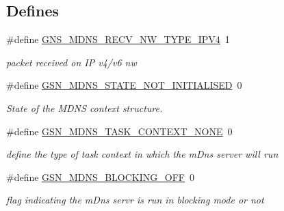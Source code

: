 \subsection*{Defines}
\begin{DoxyCompactItemize}
\item 
\#define \hyperlink{a00668_gae805e6fbb7579781605600a78cbe0959}{GNS\_\-MDNS\_\-RECV\_\-NW\_\-TYPE\_\-IPV4}~1
\begin{DoxyCompactList}\small\item\em packet received on IP v4/v6 nw \end{DoxyCompactList}\item 
\#define \hyperlink{a00668_ga0b9291043d21e03b1202e152d19abcb8}{GSN\_\-MDNS\_\-STATE\_\-NOT\_\-INITIALISED}~0
\begin{DoxyCompactList}\small\item\em State of the MDNS context structure. \end{DoxyCompactList}\item 
\#define \hyperlink{a00668_ga56106404858e7c3f99fa52890f684d53}{GSN\_\-MDNS\_\-TASK\_\-CONTEXT\_\-NONE}~0
\begin{DoxyCompactList}\small\item\em define the type of task context in which the mDns server will run \end{DoxyCompactList}\item 
\#define \hyperlink{a00668_ga67c2a611f981a7e2e787c479819f28cd}{GSN\_\-MDNS\_\-BLOCKING\_\-OFF}~0
\begin{DoxyCompactList}\small\item\em flag indicating the mDns servr is run in blocking mode or not \end{DoxyCompactList}\end{DoxyCompactItemize}
